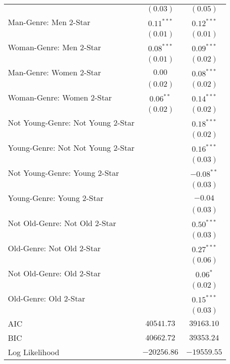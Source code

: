 \begin{center}
\begin{longtable}{l c c}
                                  & $(0.03)$      & $(0.05)$      \\
Man-Genre: Men 2-Star             & $0.11^{***}$  & $0.12^{***}$  \\
                                  & $(0.01)$      & $(0.01)$      \\
Woman-Genre: Men 2-Star           & $0.08^{***}$  & $0.09^{***}$  \\
                                  & $(0.01)$      & $(0.02)$      \\
Man-Genre: Women 2-Star           & $0.00$        & $0.08^{***}$  \\
                                  & $(0.02)$      & $(0.02)$      \\
Woman-Genre: Women 2-Star         & $0.06^{**}$   & $0.14^{***}$  \\
                                  & $(0.02)$      & $(0.02)$      \\
Not Young-Genre: Not Young 2-Star &               & $0.18^{***}$  \\
                                  &               & $(0.02)$      \\
Young-Genre: Not Not Young 2-Star &               & $0.16^{***}$  \\
                                  &               & $(0.03)$      \\
Not Young-Genre: Young 2-Star     &               & $-0.08^{**}$  \\
                                  &               & $(0.03)$      \\
Young-Genre: Young 2-Star         &               & $-0.04$       \\
                                  &               & $(0.03)$      \\
Not Old-Genre: Not Old 2-Star     &               & $0.50^{***}$  \\
                                  &               & $(0.03)$      \\
Old-Genre: Not Old 2-Star         &               & $0.27^{***}$  \\
                                  &               & $(0.06)$      \\
Not Old-Genre: Old 2-Star         &               & $0.06^{*}$    \\
                                  &               & $(0.02)$      \\
Old-Genre: Old 2-Star             &               & $0.15^{***}$  \\
                                  &               & $(0.03)$      \\
\midrule
AIC                               & $40541.73$    & $39163.10$    \\
BIC                               & $40662.72$    & $39353.24$    \\
Log Likelihood                    & $-20256.86$   & $-19559.55$   \\
\end{longtable}
\end{center}
